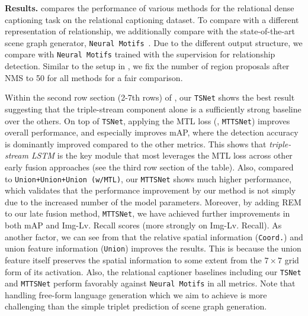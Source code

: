 \noindent\textbf{Results.}
 compares the performance of {various methods for} the relational dense captioning task on {the} relational captioning dataset. 
{To compare with a different representation of relationship,} we additionally compare with the state-of-the-art scene graph generator, \texttt{Neural Motifs}~\cite{zellers2018neural}.
Due to the different output structure, we compare with \texttt{Neural Motifs} trained with the supervision for relationship detection.
Similar to the setup in \cite{johnson2016densecap}, we fix the number of region proposals after NMS to 50 for all methods for a fair comparison.

Within the second row section (2-7th rows) of , our \texttt{TSNet} shows the best result suggesting that the triple-stream component alone is a sufficiently strong baseline over the others.
On top of \texttt{TSNet}, applying the MTL loss (\ie, \texttt{MTTSNet}) improves overall performance, and especially improves mAP, where the detection accuracy is
dominantly improved compared to 
the other metrics.
This shows that \emph{triple-stream LSTM} is the key module that most leverages the MTL loss across other early fusion approaches (see the third {row section} of the table).
{Also, compared to \texttt{Union+Union+Union~(w/MTL)}, our \texttt{MTTSNet} shows much higher performance, which validates that the performance improvement by our method is not simply due to the increased number of the model parameters.}
Moreover, by adding REM to our late fusion method, \texttt{MTTSNet}, we have achieved further improvements in both mAP and Img-Lv. 
Recall scores (more strongly on Img-Lv. Recall).
As another factor, {we can see from  that the relative spatial information (\texttt{Coord.}) and union feature information (\texttt{Union}) improves the results.} 
This is because 
the union feature itself preserves the spatial information to some extent from the $7\times 7$ grid form of its activation. 
Also, the relational captioner baselines including our \texttt{TSNet} and \texttt{MTTSNet} perform favorably against \texttt{Neural Motifs} in all metrics.
Note that handling free-form language generation which we aim to achieve is more challenging than the simple triplet prediction of scene graph generation.




















